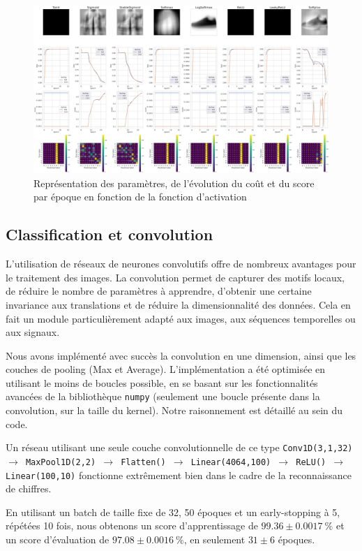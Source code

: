 \documentclass{article}
\begin{document}
\begin{figure}[htbp]
    \centering
    \includegraphics[width=\textwidth]{activation_func.pdf}
    \caption{Représentation des paramètres, de l'évolution du coût et du score par époque en fonction de la fonction d'activation}
    \label{fig:activationfunc}
\end{figure}

\subsection{Classification et convolution}

L'utilisation de réseaux de neurones convolutifs offre de nombreux avantages pour le traitement des images. La convolution permet de capturer des motifs locaux, de réduire le nombre de paramètres à apprendre, d'obtenir une certaine invariance aux translations et de réduire la dimensionnalité des données. Cela en fait un module particulièrement adapté aux images, aux séquences temporelles ou aux signaux.

Nous avons implémenté avec succès la convolution en une dimension, ainsi que les couches de pooling (Max et Average). L'implémentation a été optimisée en utilisant le moins de boucles possible, en se basant sur les fonctionnalités avancées de la bibliothèque \texttt{numpy} (seulement une boucle présente dans la convolution, sur la taille du kernel). Notre raisonnement est détaillé au sein du code.

Un réseau utilisant une seule couche convolutionnelle de ce type \texttt{Conv1D(3,1,32) $\rightarrow$ MaxPool1D(2,2) $\rightarrow$ Flatten() $\rightarrow$ Linear(4064,100) $\rightarrow$ ReLU() $\rightarrow$ Linear(100,10)} fonctionne extrêmement bien dans le cadre de la reconnaissance de chiffres.

En utilisant un batch de taille fixe de 32, 50 époques et un early-stopping à 5, répétées 10 fois, nous obtenons un score d'apprentissage de $99.36 \pm 0.0017~\%$ et un score d'évaluation de $97.08 \pm 0.0016~\%$, en seulement $31 \pm 6$ époques.
\end{document}
